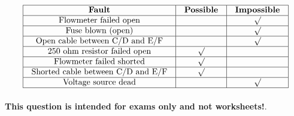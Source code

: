






$$\vbox{\offinterlineskip
\halign{\strut
\vrule \quad\hfil # \ \hfil & 
\vrule \quad\hfil # \ \hfil & 
\vrule \quad\hfil # \ \hfil \vrule \cr
\noalign{\hrule}
%
{\bf Fault} & {\bf Possible} & {\bf Impossible} \cr
%
\noalign{\hrule}
%
Flowmeter failed open &  & $\surd$ \cr
%
\noalign{\hrule}
%
Fuse blown (open) &  & $\surd$ \cr
%
\noalign{\hrule}
%
Open cable between C/D and E/F &  & $\surd$ \cr
%
\noalign{\hrule}
%
250 ohm resistor failed open & $\surd$ &  \cr
%
\noalign{\hrule}
%
Flowmeter failed shorted & $\surd$ &  \cr
%
\noalign{\hrule}
%
Shorted cable between C/D and E/F & $\surd$ &  \cr
%
\noalign{\hrule}
%
Voltage source dead &  & $\surd$ \cr
%
\noalign{\hrule}
} %
}$$ %








{\bf This question is intended for exams only and not worksheets!}.



